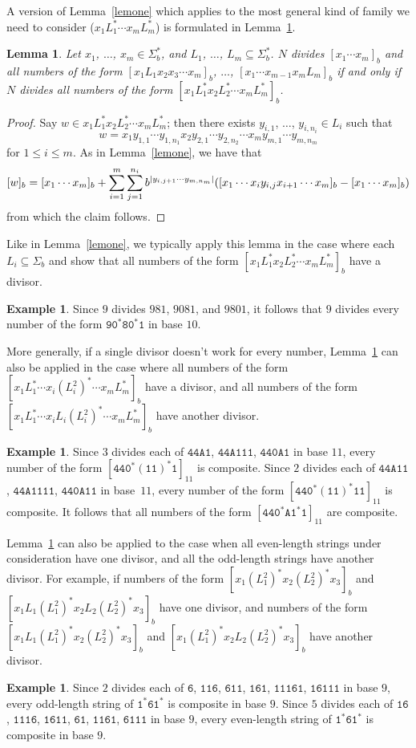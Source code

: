 \documentclass[12pt]{article}
\DeclarePairedDelimiter\abs{\lvert}{\rvert}
\theoremstyle{plain}
\newtheorem{lemma}[theorem]{Lemma}
\theoremstyle{definition}
\newtheorem{example}[theorem]{Example}
\theoremstyle{remark}
\newcommand{\0}{\mathtt{0}}
\newcommand{\1}{\mathtt{1}}
\newcommand{\2}{\mathtt{2}}
\newcommand{\3}{\mathtt{3}}
\newcommand{\4}{\mathtt{4}}
\newcommand{\5}{\mathtt{5}}
\newcommand{\6}{\mathtt{6}}
\newcommand{\7}{\mathtt{7}}
\newcommand{\8}{\mathtt{8}}
\newcommand{\9}{\mathtt{9}}
\newcommand{\A}{\mathtt{A}}
\begin{document}
A version of Lemma~\ref{lemone} which applies to the most general kind 
of family we need to consider ($x_1L_1^*\dotsm x_mL_m^*$)
is formulated in Lemma~\ref{lemtwo}.
\begin{lemma}\label{lemtwo}
Let $x_1$, $\dotsc$, $x_m\in \Sigma^*_b$, and $L_1$, $\dotsc$, 
$L_m\subseteq\Sigma^*_b$.
$N$ divides $[x_1\dotsm x_m]_b$ and all numbers of the form 
$[x_1L_1x_2x_3\dotsm x_m]_b$, $\dotsc$, $[x_1\dotsm x_{m-1}x_mL_m]_b$
if and only if $N$ divides all numbers of the form 
$[x_1L_1^*x_2L_2^*\dotsm x_mL_m^*]_b$.
\end{lemma}
\begin{proof}
Say $w\in x_1L_1^*x_2L_2^*\dotsm x_mL_m^*$; then there exists 
$y_{i,1}$, $\dotsc$, $y_{i,n_i}\in L_i$ such that
\[ w = x_1y_{1,1}\dotsm y_{1,n_1}x_2y_{2,1}\dotsm y_{2,n_2}\dotsm x_m y_{m,1}\dotsm y_{m,n_m} \]
for $1\leq i\leq m$.
As in Lemma~\ref{lemone}, we have that
\[ [w]_b = [x_1\dotsm x_m]_b + \sum_{i=1}^m\sum_{j=1}^{n_i} b^{\abs{y_{i,j+1}\dotsm y_{m,n_m}}}([x_1\dotsm x_i y_{i,j} x_{i+1}\dotsm x_m]_b-[x_1\dotsm x_m]_b) \]
from which the claim follows.
\end{proof}
Like in Lemma~\ref{lemone}, we typically apply this lemma in the case 
where each $L_i\subseteq\Sigma_b$ and show that all numbers of the 
form $[x_1L_1^*x_2L_2^*\dotsm x_mL_m^*]_b$ have a divisor.
\begin{example}
Since $9$ divides $981$, $9081$, and $9801$, it follows that $9$ 
divides every number of the form $\9\0^*\8\0^*\1$ in base $10$.
\end{example}
More generally, if a single divisor doesn't work for every number, 
Lemma~\ref{lemtwo} can also be applied in the case where all numbers 
of the form $[x_1L_1^*\dotsm x_i(L_i^2)^*\dotsm x_mL_m^*]_b$ have a 
divisor, and all numbers of the form 
$[x_1L_1^*\dotsm x_iL_i(L_i^2)^*\dotsm x_mL_m^*]_b$ have another divisor.
\begin{example}
Since $3$ divides each of $\4\4\A\1$, $\4\4\A\1\1\1$, $\4\4\0\A\1$ in 
base $11$, every number of the form $[\4\4\0^*(\1\1)^*\1]_{11}$ is composite.
Since $2$ divides each of $\4\4\A\1\1$, $\4\4\A\1\1\1\1$, $\4\4\0\A\1\1$ 
in base~$11$, every number of the form $[\4\4\0^*(\1\1)^*\1\1]_{11}$ is composite.
It follows that all numbers of the form $[\4\4\0^*\A\1^*\1]_{11}$ are composite.
\end{example}
Lemma~\ref{lemtwo} can also be applied to the case when all even-length 
strings under consideration have one divisor, and all the odd-length 
strings have another divisor.  For example, if numbers of the form 
$[x_1(L_1^2)^*x_2(L_2^2)^*x_3]_b$ and $[x_1 L_1(L_1^2)^*x_2L_2(L_2^2)^*x_3]_b$ 
have one divisor, and numbers of the form $[x_1L_1(L_1^2)^*x_2(L_2^2)^*x_3]_b$ 
and $[x_1(L_1^2)^*x_2L_2(L_2^2)^*x_3]_b$ have another divisor.
\begin{example}
Since $2$ divides each of $\6$, $\1\1\6$, $\6\1\1$, $\1\6\1$, $\1\1\1\6\1$, 
$\1\6\1\1\1$ in base $9$, every odd-length string of $\1^*\6\1^*$ is 
composite in base $9$.
Since $5$ divides each of $\1\6$, $\1\1\1\6$, $\1\6\1\1$, $\6\1$, $\1\1\6\1$, 
$\6\1\1\1$ in base $9$, every even-length string of $\1^*\6\1^*$ is composite 
in base $9$.
\end{example}
\end{document}
